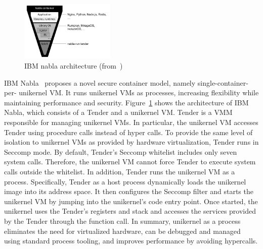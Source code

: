  
\begin{figure}[htp]
    \centering
    \includegraphics[width=0.4\textwidth]{images/nabla.png}
    \caption[IBM nabla architecture]{IBM nabla architecture (from~\cite*{Nabla})}
    \label{fig:nabla}
\end{figure}

IBM Nabla~\cite*{10.1145/3267809.3267845} proposes a novel secure container model, namely single-container- per- unikernel VM. It runs unikernel VMs as processes, increasing flexibility while maintaining performance and security. Figure~\ref{fig:nabla} shows the architecture of IBM Nabla, which consists of a Tender and a unikernel VM. Tender is a \acrshort{VMM} 
responsible for managing unikernel VMs. In particular, the unikernel VM accesses Tender using procedure calls instead of hyper calls. To provide the same level of isolation to unikernel VMs as provided by hardware virtualization, Tender runs in Seccomp mode. By default, Tender's Seccomp whitelist includes only seven system calls. Therefore, the unikernel VM cannot 
force Tender to execute system calls outside the whitelist. In addition, Tender runs the unikernel VM as a process. Specifically, Tender as a host process dynamically loads the unikernel image into its address space. It then configures the Seccomp filter and starts the unikernel VM by jumping into the unikernel's code entry point. Once started, the unikernel uses 
the Tender's registers and stack and accesses the services provided by the Tender through the function call. In summary, unikernel as a process eliminates the need for virtualized hardware, can be debugged and managed using standard process tooling, and improves performance by avoiding hypercalls.


